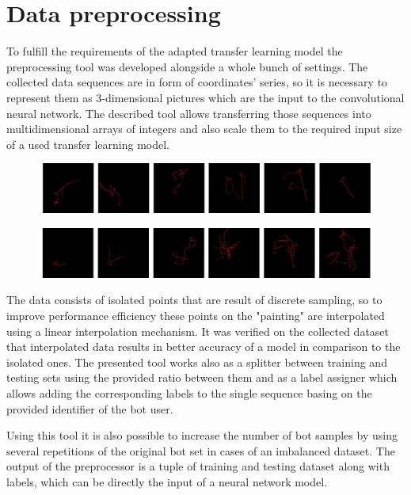\section{Data preprocessing}\label{sec:data-preprocessing}
To fulfill the requirements of the adapted transfer learning model the preprocessing tool was developed alongside a whole bunch of settings.
The collected data sequences are in form of coordinates' series, so it is necessary to represent them as 3-dimensional pictures which are the input to the convolutional neural network.
The described tool allows transferring those sequences into multidimensional arrays of integers and also scale them to the required input size of a used transfer learning model.

\begin{figure}[!hbt]
    \center
    \includegraphics[width=\linewidth]{resources/bot_sequences}
    \label{fig:bot_sequences}
\end{figure}
\begin{figure}[!hbt]
    \center
    \includegraphics[width=\linewidth]{resources/user_sequences}
    \label{fig:user_sequences}
\end{figure}


The data consists of isolated points that are result of discrete sampling, so to improve performance efficiency these points on the "painting" are interpolated using a linear interpolation mechanism.
It was verified on the collected dataset that interpolated data results in better accuracy of a model in comparison to the isolated ones.
The presented tool works also as a splitter between training and testing sets using the provided ratio between them and as a label assigner which allows adding the corresponding labels to the single sequence basing on the provided identifier of the bot user.

Using this tool it is also possible to increase the number of bot samples by using several repetitions of the original bot set in cases of an imbalanced dataset.
The output of the preprocessor is a tuple of training and testing dataset along with labels, which can be directly the input of a neural network model.